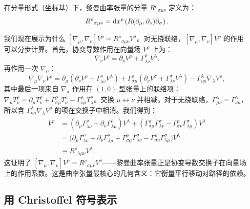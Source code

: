 在分量形式（坐标基）下，黎曼曲率张量的分量 $R^\rho{}_{\sigma\mu\nu}$ 定义为：
\begin{equation}
    R^\rho{}_{\sigma\mu\nu} = \dd x^\rho \left( R(\partial_\mu, \partial_\nu) \partial_\sigma \right).
\end{equation}

我们现在展示为什么 $[\nabla_\mu, \nabla_\nu] V^\rho = R^\rho{}_{\sigma\mu\nu} V^\sigma$。对无挠联络，$[\nabla_\mu, \nabla_\nu] V^\rho$ 的作用可以分步计算。首先，协变导数作用在向量场 $V^\rho$ 上为：
\begin{equation}
    \nabla_\nu V^\rho = \partial_\nu V^\rho + \Gamma^\rho_{\lambda\nu} V^\lambda.
\end{equation}
再作用一次 $\nabla_\mu$：
\begin{equation}
    \nabla_\mu \nabla_\nu V^\rho = \partial_\mu(\partial_\nu V^\rho + \Gamma^\rho_{\lambda\nu} V^\lambda) + \Gamma^\rho_{\sigma\mu}(\partial_\nu V^\sigma + \Gamma^\sigma_{\lambda\nu} V^\lambda) - \Gamma^\lambda_{\nu\mu} \nabla_\lambda V^\rho,
\end{equation}
其中最后一项来自 $\nabla_\mu$ 作用在 $(1,0)$ 型张量上的联络项：$\nabla_\mu T^\rho_\nu = \partial_\mu T^\rho_\nu + \Gamma^\rho_{\sigma\mu}T^\sigma_\nu - \Gamma^\lambda_{\nu\mu}T^\rho_\lambda$。交换 $\mu \leftrightarrow \nu$ 并相减。对于无挠联络，$\Gamma^\lambda_{\mu\nu} = \Gamma^\lambda_{\nu\mu}$，所以含 $\Gamma^\lambda_{\nu\mu}\nabla_\lambda V^\rho$ 的项在交换子中相消。我们得到：
\begin{align}
    [\nabla_\mu, \nabla_\nu] V^\rho
    &= (\partial_\mu \Gamma^\rho_{\lambda\nu} - \partial_\nu \Gamma^\rho_{\lambda\mu}) V^\lambda
       + (\Gamma^\rho_{\sigma\mu}\Gamma^\sigma_{\lambda\nu} - \Gamma^\rho_{\sigma\nu}\Gamma^\sigma_{\lambda\mu}) V^\lambda \nonumber\\
    &= \bigl( \partial_\mu \Gamma^\rho_{\lambda\nu} - \partial_\nu \Gamma^\rho_{\lambda\mu}
             + \Gamma^\rho_{\sigma\mu}\Gamma^\sigma_{\lambda\nu}
             - \Gamma^\rho_{\sigma\nu}\Gamma^\sigma_{\lambda\mu} \bigr) V^\lambda \nonumber\\
    &\equiv R^\rho{}_{\lambda\mu\nu} V^\lambda.
\end{align}
这证明了 $[\nabla_\mu, \nabla_\nu] V^\rho = R^\rho{}_{\sigma\mu\nu} V^\sigma$——黎曼曲率张量正是协变导数交换子在向量场上的作用系数。这是曲率张量最核心的几何含义：它衡量平行移动对路径的依赖。

\subsection{用 Christoffel 符号表示}

